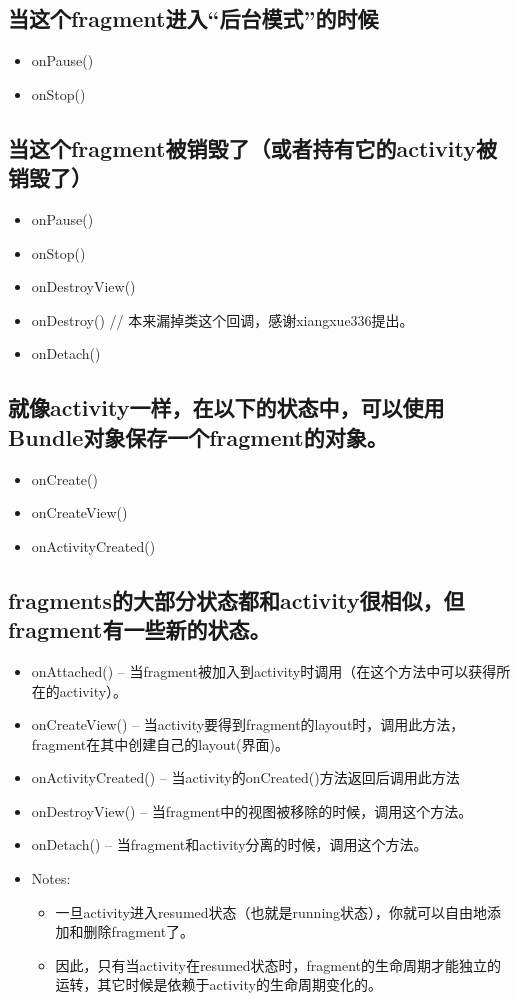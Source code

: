 \documentclass[9pt, b5paaper]{book}
\begin{document}
\subsection{当这个fragment进入“后台模式”的时候}
\label{sec-3-4-3}
\begin{itemize}
\item onPause()
\item onStop()
\end{itemize}
\subsection{当这个fragment被销毁了（或者持有它的activity被销毁了）}
\label{sec-3-4-4}
\begin{itemize}
\item onPause()
\item onStop()
\item onDestroyView()
\item onDestroy() // 本来漏掉类这个回调，感谢xiangxue336提出。
\item onDetach()
\end{itemize}
\subsection{就像activity一样，在以下的状态中，可以使用Bundle对象保存一个fragment的对象。}
\label{sec-3-4-5}
\begin{itemize}
\item onCreate()
\item onCreateView()
\item onActivityCreated()
\end{itemize}
\subsection{fragments的大部分状态都和activity很相似，但fragment有一些新的状态。}
\label{sec-3-4-6}
\begin{itemize}
\item onAttached() -- 当fragment被加入到activity时调用（在这个方法中可以获得所在的activity）。
\item onCreateView() -- 当activity要得到fragment的layout时，调用此方法，fragment在其中创建自己的layout(界面)。
\item onActivityCreated() -- 当activity的onCreated()方法返回后调用此方法
\item onDestroyView() -- 当fragment中的视图被移除的时候，调用这个方法。
\item onDetach() -- 当fragment和activity分离的时候，调用这个方法。
\item Notes:
\begin{itemize}
\item 一旦activity进入resumed状态（也就是running状态），你就可以自由地添加和删除fragment了。
\item 因此，只有当activity在resumed状态时，fragment的生命周期才能独立的运转，其它时候是依赖于activity的生命周期变化的。
\end{itemize}
\end{itemize}
\end{document}
